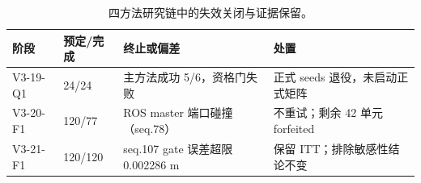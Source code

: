 \begin{table}[htbp]
\centering
\caption{四方法研究链中的失效关闭与证据保留。}
\label{tab:v319-v321-integrity}
\footnotesize
\begin{tabular}{llll}
\toprule
阶段 & 预定/完成 & 终止或偏差 & 处置\\
\midrule
V3-19-Q1 & 24/24 & 主方法成功 5/6，资格门失败 & 正式 seeds 退役，未启动正式矩阵\\
V3-20-F1 & 120/77 & ROS master 端口碰撞（seq.78） & 不重试；剩余 42 单元 forfeited\\
V3-21-F1 & 120/120 & seq.107 gate 误差超限 0.002286 m & 保留 ITT；排除敏感性结论不变\\
\bottomrule
\end{tabular}
\end{table}
